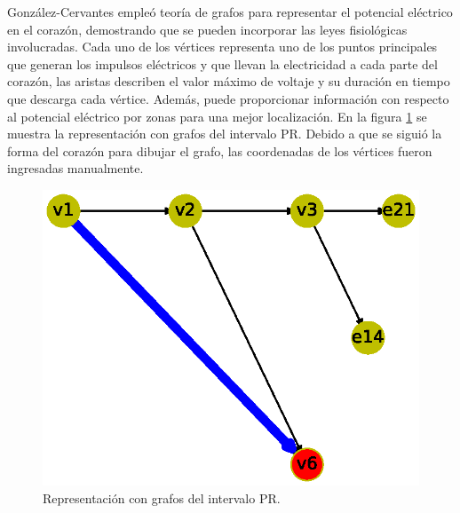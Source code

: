 \documentclass{article}
\begin{document}
González-Cervantes \cite{gonzalez2016potencial} empleó teoría de grafos para representar el potencial eléctrico en el corazón, demostrando que se pueden incorporar las leyes fisiológicas involucradas. Cada uno de los vértices representa uno de los puntos principales que generan los impulsos eléctricos y que llevan la electricidad a cada parte del corazón, las aristas describen el valor máximo de voltaje y su
duración en tiempo que descarga cada vértice. Además, puede proporcionar información con respecto al potencial eléctrico por zonas para una mejor localización.
En la figura \ref{Figura 12} se muestra la representación con grafos del intervalo PR. Debido a que se siguió la forma del corazón para dibujar el grafo, las coordenadas de los vértices fueron ingresadas manualmente.


\begin{figure}
  \centering 
  \includegraphics[width=.8\columnwidth]{fig12.eps}
  \caption{Representación con grafos del intervalo PR.}
  \label{Figura 12}
\end{figure}





\newpage


\end{document}
